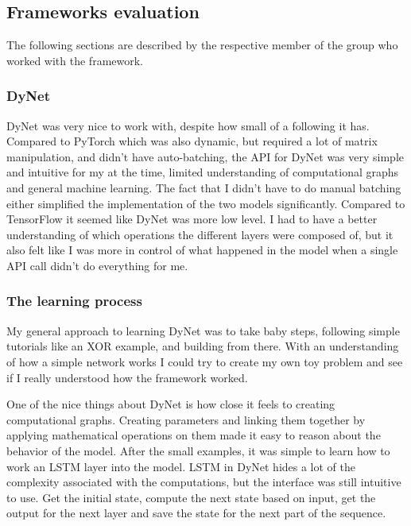 \subsection{Frameworks evaluation}\label{subsec:frameworks}

The following sections are described by the respective member of the group who
worked with the framework. 

\subsubsection{DyNet}

DyNet was very nice to work with, despite how small of a following it has.
Compared to PyTorch which was also dynamic, but required a lot of matrix
manipulation, and didn't have auto-batching, the API for DyNet was very simple
and intuitive for my at the time, limited understanding of computational graphs
and general machine learning. The fact that I didn't have to do manual batching
either simplified the implementation of the two models significantly. Compared
to TensorFlow it seemed like DyNet was more low level. I had to have a better
understanding of which operations the different layers were composed of, but it
also felt like I was more in control of what happened in the model when a
single API call didn't do everything for me.

\subsubsection*{The learning process}

My general approach to learning DyNet was to take baby steps, following simple
tutorials like an XOR example, and building from there. With an understanding of
how a simple network works I could try to create my own toy problem and see
if I really understood how the framework worked. 

One of the nice things about DyNet is how close it feels to creating
computational graphs. Creating parameters and linking them together by applying
mathematical operations on them made it easy to reason about the behavior of
the model. After the small examples, it was simple to learn how to work an LSTM
layer into the model. LSTM in DyNet hides a lot of the complexity associated
with the computations, but the interface was still intuitive to use. Get the
initial state, compute the next state based on input, get the output for the
next layer and save the state for the next part of the sequence.

